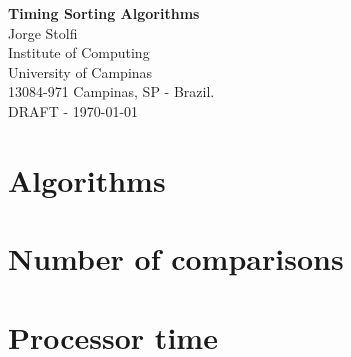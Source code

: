 \documentclass[12pt,twoside]{article}
\begin{document}




\begin{center}
{\Large\bf Timing Sorting Algorithms}\\[5mm]
{\large\rm Jorge Stolfi}\\[1mm]
{\normalsize\rm Institute  of Computing\\University
of Campinas\\13084-971  Campinas,  SP - Brazil.}\\[3mm]
{\small\rm DRAFT - \today}
\end{center}

\def\pn{\texttt}

\section{Algorithms}

  

\section{Number of comparisons}

  

\section{Processor time}

  
\end{document}
